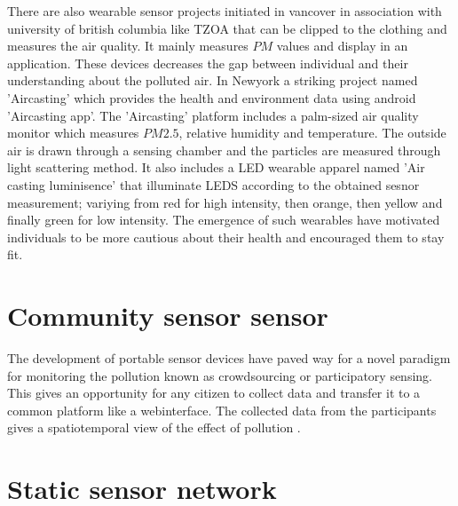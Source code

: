  There are also wearable sensor projects initiated in vancover in association with university of british columbia like TZOA \cite{tzoa} that can be clipped to the clothing and measures the air quality. It mainly measures $PM$ values and display in an application. These devices decreases the gap between individual and their understanding about the polluted air. In Newyork a striking project named 'Aircasting'\cite{aircasting} which provides the health and environment data using android 'Aircasting app'. The 'Aircasting'\cite{Han2010} platform includes a palm-sized air quality monitor which measures $PM2.5$, relative humidity and temperature. The outside air is drawn through a sensing chamber and the particles are measured through light scattering method. It also includes a LED wearable apparel named 'Air casting luminisence'\cite{Luminescence} that illuminate LEDS according to the obtained sesnor measurement; variying from red for high intensity, then orange, then yellow and finally green for low intensity. The emergence of such wearables have motivated individuals to be more cautious about their health and encouraged them to stay fit.

\section{Community sensor sensor}

The development of portable sensor devices have paved way for a novel paradigm for monitoring the pollution known as crowdsourcing or participatory sensing. This gives an opportunity for any citizen to collect data and transfer it to a common platform like a webinterface. The collected data  from the participants gives a spatiotemporal view of the effect of pollution \cite{Kanhere2013}.




\section{Static sensor network}

